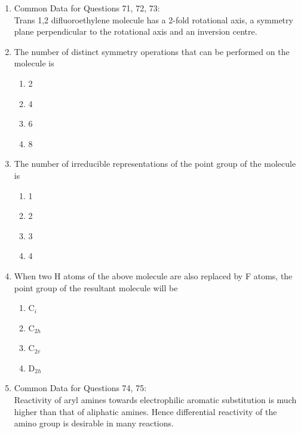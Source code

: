 \documentclass[journal,12pt,onecolumn]{IEEEtran}
\theoremstyle{remark}
\begin{document}
\begin{enumerate}
\item{Common Data for Questions 71, 72, 73:} \\
Trans 1,2 difluoroethylene molecule has a 2-fold rotational axis, a symmetry plane perpendicular to the rotational axis and an inversion centre.

\item  The number of distinct symmetry operations that can be performed on the molecule is \hfill{}

\begin{multicols}{2}
\begin{enumerate} 
\item 2
\item 4
\item 6
\item 8
\end{enumerate}
\end{multicols}
  

\item  The number of irreducible representations of the point group of the molecule is \hfill{}

\begin{multicols}{2}
\begin{enumerate} 
\item 1
\item 2
\item 3
\item 4
\end{enumerate}
\end{multicols}
  

\item  When two H atoms of the above molecule are also replaced by F atoms, the point group of the resultant molecule will be \hfill{}

\begin{multicols}{2}
\begin{enumerate} 
\item C$_i$
\item C$_{2h}$
\item C$_{2v}$
\item D$_{2h}$
\end{enumerate}
\end{multicols}
 

\item{Common Data for Questions 74, 75:} \\
Reactivity of aryl amines towards electrophilic aromatic substitution is much higher than that of aliphatic amines. Hence differential reactivity of the amino group is desirable in many reactions.
  

\end{enumerate}
\end{document}
